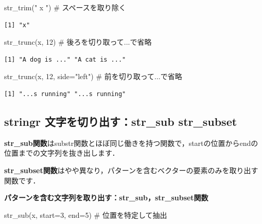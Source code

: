 \documentclass[
  letterpaper,
  DIV=11,
  numbers=noendperiod]{scrreprt}
\newenvironment{Shaded}{\begin{snugshade}}{\end{snugshade}}
\newcommand{\AttributeTok}[1]{\textcolor[rgb]{0.40,0.45,0.13}{#1}}
\newcommand{\CommentTok}[1]{\textcolor[rgb]{0.37,0.37,0.37}{#1}}
\newcommand{\DecValTok}[1]{\textcolor[rgb]{0.68,0.00,0.00}{#1}}
\newcommand{\FunctionTok}[1]{\textcolor[rgb]{0.28,0.35,0.67}{#1}}
\newcommand{\NormalTok}[1]{\textcolor[rgb]{0.00,0.23,0.31}{#1}}
\newcommand{\StringTok}[1]{\textcolor[rgb]{0.13,0.47,0.30}{#1}}
\begin{document}
\begin{Shaded}
\begin{Highlighting}[]
\FunctionTok{str\_trim}\NormalTok{(}\StringTok{" x "}\NormalTok{) }\CommentTok{\# スペースを取り除く}
\end{Highlighting}
\end{Shaded}

\begin{verbatim}
[1] "x"
\end{verbatim}

\begin{Shaded}
\begin{Highlighting}[]
\FunctionTok{str\_trunc}\NormalTok{(x, }\DecValTok{12}\NormalTok{) }\CommentTok{\# 後ろを切り取って...で省略}
\end{Highlighting}
\end{Shaded}

\begin{verbatim}
[1] "A dog is ..." "A cat is ..."
\end{verbatim}

\begin{Shaded}
\begin{Highlighting}[]
\FunctionTok{str\_trunc}\NormalTok{(x, }\DecValTok{12}\NormalTok{, }\AttributeTok{side=}\StringTok{"left"}\NormalTok{) }\CommentTok{\# 前を切り取って...で省略}
\end{Highlighting}
\end{Shaded}

\begin{verbatim}
[1] "...s running" "...s running"
\end{verbatim}

\hypertarget{stringr-ux6587ux5b57ux3092ux5207ux308aux51faux3059str_sub-str_subset}{%
\subsection{stringr 文字を切り出す：str\_sub
str\_subset}\label{stringr-ux6587ux5b57ux3092ux5207ux308aux51faux3059str_sub-str_subset}}

\textbf{str\_sub関数}はsubstr関数とほぼ同じ働きを持つ関数で，startの位置からendの位置までの文字列を抜き出します．

\textbf{str\_subset関数}はやや異なり，パターンを含むベクターの要素のみを取り出す関数です．

\textbf{パターンを含む文字列を取り出す：str\_sub，str\_subset関数}

\begin{Shaded}
\begin{Highlighting}[]
\FunctionTok{str\_sub}\NormalTok{(x, }\AttributeTok{start=}\DecValTok{3}\NormalTok{, }\AttributeTok{end=}\DecValTok{5}\NormalTok{) }\CommentTok{\# 位置を特定して抽出}
\end{Highlighting}
\end{Shaded}
\end{document}

